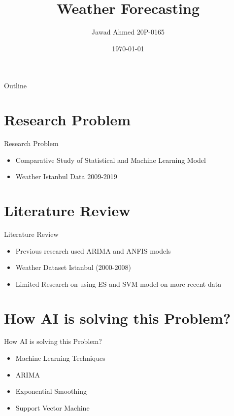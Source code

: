 \documentclass{beamer}
\title{Weather Forecasting}
\author{Jawad Ahmed 20P-0165}
\institute{National University of Computer and Emerging Sciences}
\date{\today}
\begin{document}
\begin{frame}
\titlepage
\end{frame}

\begin{frame}{Outline}
\tableofcontents
\end{frame}

\section{Research Problem}

\begin{frame}{Research Problem}
\begin{itemize}
\item Comparative Study of Statistical and Machine Learning Model
\item Weather Istanbul Data 2009-2019
\end{itemize}
\end{frame}


\section{Literature Review}

\begin{frame}{Literature Review}
\begin{itemize}
\item Previous research used ARIMA and ANFIS models
\item Weather Dataset Istanbul (2000-2008)
\item Limited Research on using ES and SVM model on more recent data
\end{itemize}
\end{frame}

\section{How AI is solving this Problem?}

\begin{frame}{How AI is solving this Problem?}
\begin{itemize}
\item Machine Learning Techniques
\item ARIMA
\item Exponential Smoothing
\item Support Vector Machine
\end{itemize}
\end{frame}
\end{document}
